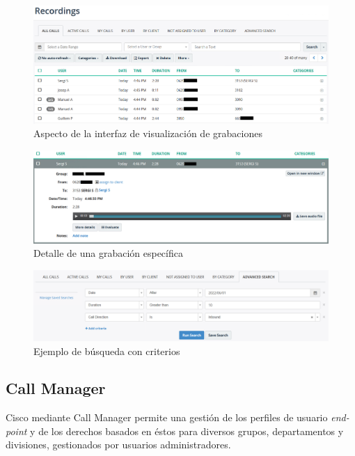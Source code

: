\documentclass[a4paper, 12pt]{book}
\begin{document}
\begin{figure}
  \centering
  \includegraphics[scale=0.65]{img/fig_grabaciones}
  \caption{Aspecto de la interfaz de visualización de grabaciones}
  \label{figura:fig_grabaciones}
\end{figure}

\begin{figure}
  \centering
  \includegraphics[scale=0.65]{img/fig_grabaciones_02}
  \caption{Detalle de una grabación específica}
  \label{figura:fig_grabaciones_02}
\end{figure}

\begin{figure}
  \centering
  \includegraphics[scale=0.65]{img/fig_filtros}
  \caption{Ejemplo de búsqueda con criterios}
  \label{figura:fig_filtros}
\end{figure}


\subsection{Call Manager}
\label{sec:call_manager}

Cisco mediante Call Manager permite una gestión de los perfiles de usuario \emph{end-point} y de los derechos basados en éstos para diversos grupos, departamentos y divisiones, gestionados por usuarios administradores.
\end{document}

